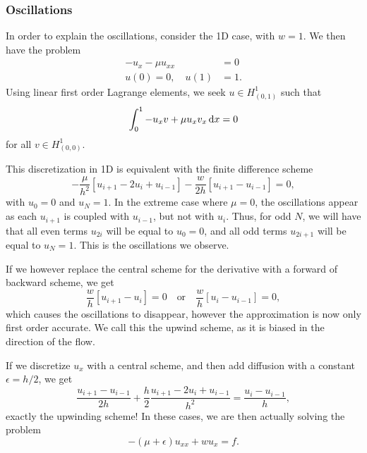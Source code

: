\subsubsection{Oscillations}
In order to explain the oscillations, consider the 1D case, with $w = 1$.
We then have the problem
\begin{equation}
    \begin{split}
        - u_x - \mu u_{xx} &= 0 \\
        u(0) = 0, \quad u(1) &= 1.
    \end{split}
\end{equation}
Using linear first order Lagrange elements, we seek $u \in H^1_{(0,1)}$ such that
\begin{equation}
    \int_{0}^{1} - u_x v + \mu u_x v_x \mathop{}\!\mathrm{d} x = 0
\end{equation}
for all $v \in H^1_{(0,0)}$.

This discretization in 1D is equivalent with the finite difference scheme
\begin{equation}
    -\frac{\mu}{h^2}\left[
        u_{i+1} - 2u_i + u_{i-1}
    \right] - \frac{w}{2h} \left[
        u_{i+1} - u_{i-1}
    \right] = 0,
\end{equation}
with $u_0 = 0$ and $u_N = 1$.
In the extreme case where $\mu = 0$, the oscillations appear as each $u_{i + 1}$ is coupled with $u_{i - 1}$, but not with $u_i$.
Thus, for odd $N$, we will have that all even terms $u_{2i}$ will be equal to $u_0 = 0$, and all odd terms $u_{2i + 1}$ will be equal to $u_N = 1$.
This is the oscillations we observe.

If we however replace the central scheme for the derivative with a forward of backward scheme, we get
\begin{equation}
    \frac{w}{h} \left[
        u_{i+1} - u_i
    \right] = 0
    \quad\text{or}\quad
    \frac{w}{h} \left[
        u_i - u_{i-1}
    \right] = 0,
\end{equation}
which causes the oscillations to disappear, however the approximation is now only first order accurate.
We call this the upwind scheme, as it is biased in the direction of the flow.

If we discretize $u_x$ with a central scheme, and then add diffusion with a constant $\epsilon=h/2$, we get
\begin{equation}
    \frac{u_{i + 1} - u_{i - 1}}{2h} + \frac{h}{2} \frac{u_{i + 1} - 2u_i + u_{i - 1}}{h^2} = \frac{u_i - u_{i - 1}}{h},
\end{equation}
exactly the upwinding scheme!
In these cases, we are then actually solving the problem
\begin{equation}
    -(\mu + \epsilon)u_{xx} + w u_x = f.
\end{equation}

